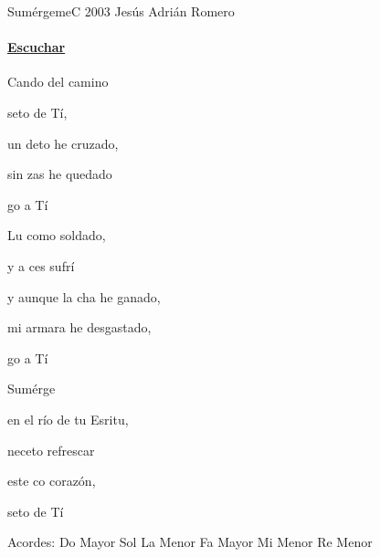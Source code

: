 \documentclass[12pt, spanish]{book}
\begin{document}
    \begin{song}{Sumérgeme}{C}
    {2003} %
    {Jesús Adrián Romero}
    {} %
    {}
        \ifChordBk
        \paragraph{\mbox{}\hfill\protect\href{https://open.spotify.com/intl-es/track/4vmPvQY7m6MC77mKDdJIkD}{Escuchar}\mbox{}\hfill}
        \fi


        \begin{SBOpGroup}
            Cando del camino

            seto de Tí,

            un deto he cruzado,

            sin zas he quedado

            go a Tí
        \end{SBOpGroup}

        \begin{SBOpGroup}
            Lu como soldado,

            y a ces sufrí

            y aunque la cha he ganado,

            mi armara he desgastado,

            go a Tí
        \end{SBOpGroup}

        \begin{SBChorus}
            Sumérge

            en el río de tu Esritu,

            neceto refrescar

            este co corazón,

            seto de Tí
        \end{SBChorus}


        \ifChordBk
        \begin{SBOpGroup}
            Acordes:
            \upchord{\C}\qquad Do Mayor \hfill
            \upchord{\G}\qquad Sol \hfill\null\break
            \upchord{\Am}\qquad La Menor \hfill
            \upchord{\F}\qquad Fa Mayor \hfill\null\break
            \upchord{\Em}\qquad Mi Menor \hfill
            \upchord{\Dm}\qquad Re Menor \hfill\null\break
        \end{SBOpGroup}
        \fi
    \end{song}
\end{document}
